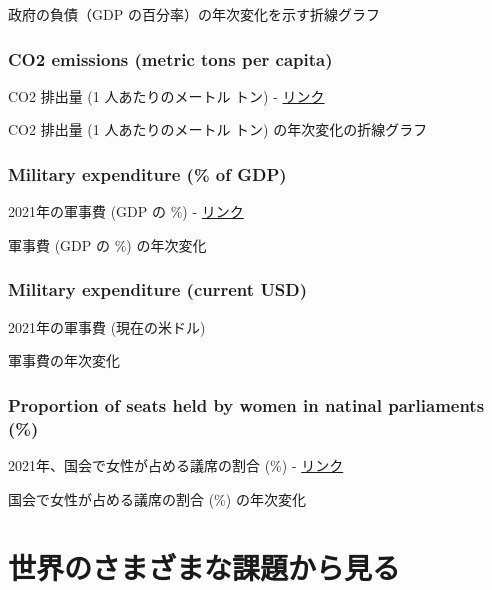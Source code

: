 \documentclass[
  xelatex, ja=standard]{bxjsbook}
\theoremstyle{definition}
\theoremstyle{definition}
\theoremstyle{definition}
\theoremstyle{definition}
\theoremstyle{remark}
\begin{document}
政府の負債（GDP の百分率）の年次変化を示す折線グラフ

\hypertarget{co2-emissions-metric-tons-per-capita}{%
\subsubsection{CO2 emissions (metric tons per capita)}\label{co2-emissions-metric-tons-per-capita}}

CO2 排出量 (1 人あたりのメートル トン) - \href{https://data.worldbank.org/indicator/EN.ATM.CO2E.PC?locations=JP-GB-RU-FR-CN-US-UA-DE\&start=2019\&end=2019\&view=bar}{リンク}

CO2 排出量 (1 人あたりのメートル トン) の年次変化の折線グラフ

\hypertarget{military-expenditure-of-gdp}{%
\subsubsection{Military expenditure (\% of GDP)}\label{military-expenditure-of-gdp}}

2021年の軍事費 (GDP の \%) - \href{https://data.worldbank.org/indicator/MS.MIL.XPND.GD.ZS?locations=JP-GB-RU-FR-CN-UA\&start=2021\&end=2021\&view=bar}{リンク}

軍事費 (GDP の \%) の年次変化

\hypertarget{military-expenditure-current-usd}{%
\subsubsection{Military expenditure (current USD)}\label{military-expenditure-current-usd}}

2021年の軍事費 (現在の米ドル)

軍事費の年次変化

\hypertarget{proportion-of-seats-held-by-women-in-natinal-parliaments}{%
\subsubsection{Proportion of seats held by women in natinal parliaments (\%)}\label{proportion-of-seats-held-by-women-in-natinal-parliaments}}

2021年、国会で女性が占める議席の割合 (\%) - \href{https://data.worldbank.org/indicator/SG.GEN.PARL.ZS?locations=JP-GB-RU-FR-CN-US-UA-DE\&start=2021\&end=2021\&view=bar}{リンク}

国会で女性が占める議席の割合 (\%) の年次変化

\hypertarget{ux4e16ux754cux306eux3055ux307eux3056ux307eux306aux8ab2ux984cux304bux3089ux898bux308b}{%
\section{世界のさまざまな課題から見る}\label{ux4e16ux754cux306eux3055ux307eux3056ux307eux306aux8ab2ux984cux304bux3089ux898bux308b}}
\end{document}
